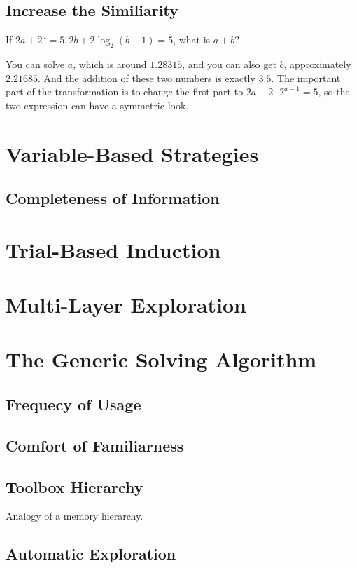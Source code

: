 \subsection{Increase the Similiarity}

\begin{example}
  If $2a+2^a = 5, 2b+ 2\log_2{(b-1)} = 5$, what is $a+b$?
\end{example}

You can solve $a$, which is around $1.28315$, and you can also get $b$, approximately $2.21685$. And the addition of these two numbers is exactly $3.5$. The important part of the transformation is to change the first part to $2a + 2 \cdot 2^{a-1} = 5$, so the two expression can have a symmetric look.



\section{Variable-Based Strategies}
\subsection{Completeness of Information}

\section{Trial-Based Induction}

\section{Multi-Layer Exploration}

\section{The Generic Solving Algorithm}
\subsection{Frequecy of Usage}
\subsection{Comfort of Familiarness}
\subsection{Toolbox Hierarchy}
Analogy of a memory hierarchy.
\subsection{Automatic Exploration}

